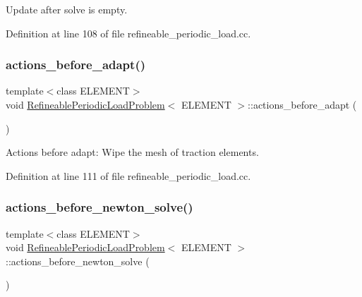 Update after solve is empty. 



Definition at line 108 of file refineable\+\_\+periodic\+\_\+load.\+cc.

\mbox{\label{classRefineablePeriodicLoadProblem_aae144ae04342a103a870d9dfbf29c188}} 
\subsubsection{\texorpdfstring{actions\+\_\+before\+\_\+adapt()}{actions\_before\_adapt()}}
{\footnotesize\ttfamily template$<$class E\+L\+E\+M\+E\+NT$>$ \\
void \hyperlink{classRefineablePeriodicLoadProblem}{Refineable\+Periodic\+Load\+Problem}$<$ E\+L\+E\+M\+E\+NT $>$\+::actions\+\_\+before\+\_\+adapt (\begin{DoxyParamCaption}{ }\end{DoxyParamCaption})\hspace{0.3cm}{\ttfamily [inline]}}



Actions before adapt\+: Wipe the mesh of traction elements. 



Definition at line 111 of file refineable\+\_\+periodic\+\_\+load.\+cc.

\mbox{\label{classRefineablePeriodicLoadProblem_aece9eef8c0bf14527ea1fb6902820cb4}} 
\subsubsection{\texorpdfstring{actions\+\_\+before\+\_\+newton\+\_\+solve()}{actions\_before\_newton\_solve()}}
{\footnotesize\ttfamily template$<$class E\+L\+E\+M\+E\+NT$>$ \\
void \hyperlink{classRefineablePeriodicLoadProblem}{Refineable\+Periodic\+Load\+Problem}$<$ E\+L\+E\+M\+E\+NT $>$\+::actions\+\_\+before\+\_\+newton\+\_\+solve (\begin{DoxyParamCaption}{ }\end{DoxyParamCaption})\hspace{0.3cm}{\ttfamily [inline]}}



